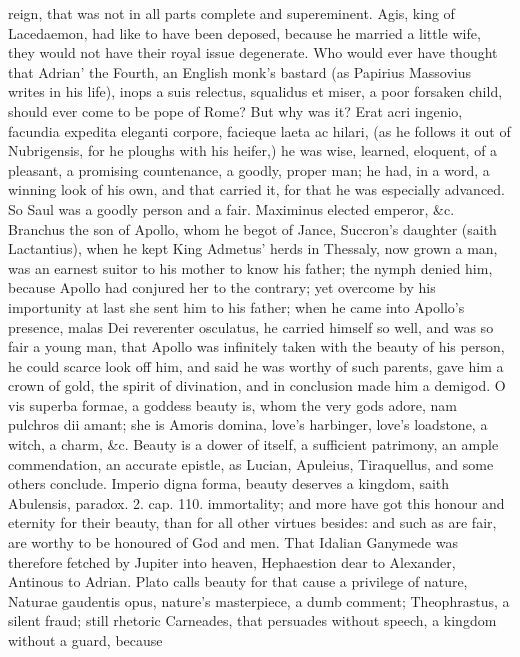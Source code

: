 {reign, that was not in all parts complete and supereminent. Agis, king
of Lacedaemon, had like to have been deposed, because he married a
little wife, they would not have their royal issue degenerate. Who
would ever have thought that Adrian' the Fourth, an English monk's
bastard (as Papirius Massovius writes in his life), inops a suis
relectus, squalidus et miser, a poor forsaken child, should ever come
to be pope of Rome? But why was it? Erat acri ingenio, facundia
expedita eleganti corpore, facieque laeta ac hilari, (as he follows it
out of Nubrigensis, for he ploughs with his heifer,) he was wise,
learned, eloquent, of a pleasant, a promising countenance, a goodly,
proper man; he had, in a word, a winning look of his own, and that
carried it, for that he was especially advanced. So Saul was a goodly
person and a fair. Maximinus elected emperor, \&c. Branchus the son of
Apollo, whom he begot of Jance, Succron's daughter (saith Lactantius),
when he kept King Admetus' herds in Thessaly, now grown a man, was an
earnest suitor to his mother to know his father; the nymph denied him,
because Apollo had conjured her to the contrary; yet overcome by his
importunity at last she sent him to his father; when he came into
Apollo's presence, malas Dei reverenter osculatus, he carried himself
so well, and was so fair a young man, that Apollo was infinitely taken
with the beauty of his person, he could scarce look off him, and said
he was worthy of such parents, gave him a crown of gold, the spirit of
divination, and in conclusion made him a demigod. O vis superba formae,
a goddess beauty is, whom the very gods adore, nam pulchros dii amant;
she is Amoris domina, love's harbinger, love's loadstone, a witch, a
charm, \&c. Beauty is a dower of itself, a sufficient patrimony, an
ample commendation, an accurate epistle, as Lucian,
Apuleius, Tiraquellus, and some others conclude. Imperio digna
forma, beauty deserves a kingdom, saith Abulensis, paradox. 2. cap.
110. immortality; and more have got this honour and eternity for
their beauty, than for all other virtues besides: and such as are fair,
are worthy to be honoured of God and men. That Idalian Ganymede was
therefore fetched by Jupiter into heaven, Hephaestion dear to
Alexander, Antinous to Adrian. Plato calls beauty for that cause a
privilege of nature, Naturae gaudentis opus, nature's masterpiece, a
dumb comment; Theophrastus, a silent fraud; still rhetoric Carneades,
that persuades without speech, a kingdom without a guard, because
}
